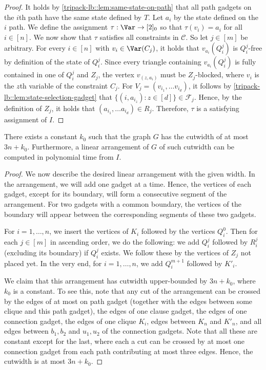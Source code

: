 \documentclass[a4paper,UKenglish,cleveref, autoref, thm-restate]{lipics-v2021}
\begin{document}
\begin{proof}
    It holds by \cref{tripack-lb::lem:same-state-on-path} that all path gadgets on the $i$th path have the same state defined by $T$. Let $a_i$ by the state defined on the $i$ path. We define the assignment $\tau: \Var \to [2]_0$ so that $\tau(v_i) = a_i$ for all $i\in [n]$. 
    We now show that $\tau$ satisfies all constraints in $\mathcal{C}$.
    So let $j \in [m]$ be arbitrary.
    For every $i \in [n]$ with $v_i \in \Var(C_j)$, 
    it holds that $v_{a_i}(Q_i^j)$ is $Q_i^j$-free by definition of the state of $Q_i^j$. 
    Since every triangle containing $v_{a_i}(Q_i^j)$ is fully contained in one of $Q_i^j$ and $Z_j$, the vertex $v_{(z, a_i)}$ must be $Z_j$-blocked, where $v_i$ is the $z$th variable of the constraint $C_j$.
    For $V_j = (v_{i_1},\dots v_{i_d})$, it follows by \cref{tripack-lb::lem:state-selection-gadget} that $\{(i, a_{i_z})\colon z\in[d]\} \in \mathcal{F}_j$. Hence, by the definition of $Z_j$, it holds that $(a_{i_1}, \dots a_{i_d})\in R_j$. Therefore, $\tau$ is a satisfying assignment of $I$.
\end{proof}

\begin{lemma}
    There exists a constant $k_0$ such that the graph $G$ has the cutwidth of at most $3n + k_0$.
    Furthermore, a linear arrangement of $G$ of such cutwidth can be computed in polynomial time from $I$.
\end{lemma}

\begin{proof}
    We now describe the desired linear arrangement with the given width. 
    In the arrangement, we will add one gadget at a time. Hence, the vertices of each gadget, except for its boundary, will form a consecutive segment of the arrangement. For two gadgets with a common boundary, the vertices of the boundary will appear between the corresponding segments of these two gadgets.
    
    For $i = 1, \dots, n$, we insert the vertices of $K_i$ followed by the vertices $Q_i^0$. 
    Then for each $j\in [m]$ in ascending order, we do the following: we add $Q_i^j$ followed by $R_i^j$ (excluding its boundary) if $Q_i^j$ exists. 
    We follow these by the vertices of $Z_j$ not placed yet. 
    In the very end, for $i = 1, \dots, n$, we add $Q_i^{m+1}$ followed by $K'_i$.
    
    We claim that this arrangement has cutwidth upper-bounded by $3n + k_0$, where $k_0$ is a constant. To see this, note that any cut of the arrangement can be crossed by the edges of at most on path gadget (together with the edges between some clique and this path gadget),
    the edges of one clause gadget, the edges of one connection gadget, the edges of one clique $K_i$, edges between $K_n$ and $K'_n$, and all edges between $b_1, b_2$ and $u_1, u_2$ of the connection gadgets. 
    Note that all these are constant except for the last, where each a cut can be crossed by at most one connection gadget from each path contributing at most three edges. 
    Hence, the cutwidth is at most $3n + k_0$.
\end{proof}
\end{document}
